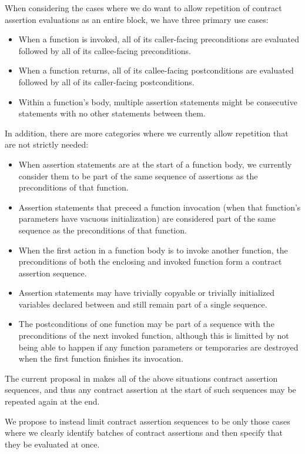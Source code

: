 When considering the cases where we do want to allow repetition
of contract assertion evaluations as an entire block,
we have three primary use cases:
\begin{itemize}
\item{When a function is invoked, all of its caller-facing preconditions
  are evaluated followed by all of its callee-facing preconditions.}
\item{When a function returns, all of its callee-facing postconditions
  are evaluated followed by all of its caller-facing postconditions.}
\item{Within a function's body, multiple assertion statements might be
  consecutive statements with no other statements between them.}
\end{itemize}          
In addition, there are more categories where we currently
allow repetition that are not strictly needed:
\begin{itemize}
\item{When assertion statements are at the start of a function body,
we currently consider them to be part of the same sequence of assertions
as the preconditions of that function.}
\item{Assertion statements that preceed a function invocation (when
that function's parameters have vacuous initialization) are considered
part of the same sequence as the preconditions of that function.}
\item{When the first action in a function body is to invoke another
function, the preconditions of both the enclosing and invoked function
form a contract assertion sequence.}
\item{Assertion statements may have trivially copyable or trivially initialized
variables declared between and still remain part of a single sequence.}
\item{The postconditions of one function may be part of a sequence
with the preconditions of the next invoked function, although this is limitted
by not being able to happen if any function parameters or temporaries are
destroyed when the first function finishes its invocation.}
\end{itemize}

The current proposal in \cite{P2900R11} makes all of the above situations
contract assertion sequences, and thus any contract assertion at the start
of such sequences may be repeated again at the end.

We propose to instead limit contract assertion sequences to be only
those cases where we clearly identify batches of contract assertions
and then specify that they be evaluated at once.

